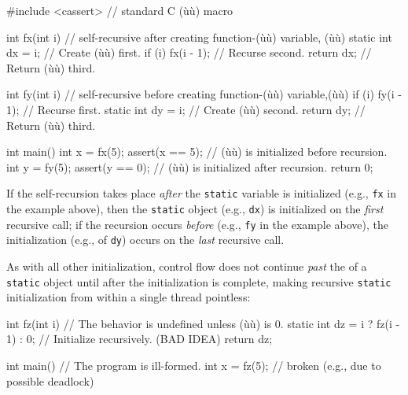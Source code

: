 \begin{emcppshiddenlisting}[emcppsbatch=e2]
#include <cassert>  // standard C (ù{}ù) macro
\end{emcppshiddenlisting}
\begin{emcppslisting}[emcppsbatch=e2]
int fx(int i)  // self-recursive after creating function-(ù{}ù) variable, (ù{}ù)
{
    static int dx = i;     // Create (ù{}ù) first.
    if (i) { fx(i - 1); }  // Recurse second.
    return dx;             // Return (ù{}ù) third.
}

int fy(int i)  // self-recursive before creating function-(ù{}ù) variable,(ù{}ù)
{
    if (i) { fy(i - 1); }  // Recurse first.
    static int dy = i;     // Create (ù{}ù) second.
    return dy;             // Return (ù{}ù) third.
}

int main()
{
    int x = fx(5);  assert(x == 5);  // (ù{}ù) is initialized before recursion.
    int y = fy(5);  assert(y == 0);  // (ù{}ù) is initialized after recursion.
    return 0;
}
\end{emcppslisting}

\noindent If the self-recursion takes place \emph{after} the \lstinline!static!
variable is initialized (e.g., \lstinline!fx! in the example above), then the
\lstinline!static! object (e.g., \lstinline!dx!) is initialized on the
\emph{first} recursive call; if the recursion occurs \emph{before}
(e.g., \lstinline!fy! in the example above), the initialization (e.g., of \lstinline!dy!)
occurs on the \emph{last} recursive call.

As with all other initialization, control flow does not continue
\emph{past} the  of a \lstinline!static! object until
after the initialization is complete, making recursive \lstinline!static!
initialization from within a single thread pointless:

\begin{emcppslisting}
int fz(int i)  // The behavior is undefined unless (ù{}ù) is 0.
{
    static int dz = i ? fz(i - 1) : 0;  // Initialize recursively. (BAD IDEA)
    return dz;
}

int main()  // The program is ill-formed.
{
    int x = fz(5);  // broken (e.g., due to possible deadlock)
}
\end{emcppslisting}

